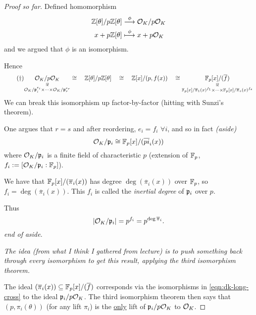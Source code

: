 \begin{proof}[Proof so far]
    Defined homomorphism
    \begin{align*}
        \mathbb Z[\theta]/p\mathbb Z[\theta] & \overset{\phi}{\longrightarrow} \mathcal{O}_K/p\mathcal{O}_K \\
        x + p\mathbb Z[\theta]         & \overset{\phi}{\longmapsto} x + p\mathcal{O}_K
    \end{align*}
    and we argued that $\phi$ is an isomorphism.

    Hence
    \begin{equation}\label{eqn:dk-long-cross}\tag{\textdagger}
        \underset{
        \substack{\text{\rotatebox[origin=c]{270}{$\cong$}} \\ \riO_K/\frk{p}_i^{e_i}\times \cdots \times \riO_K/\frk{p}_r^{e_r}}
        }{\riO_K / p\riO_K}
        \cong \quad \ZZ[\theta]/p\ZZ[\theta]\quad \cong\quad  \ZZ[x]/(p, f(x))\quad\cong \underset{
            \substack{\text{\rotatebox[origin=c]{270}{$\cong$}} \\ \FF_p[x]/\overline{\pi}_1(x)^{f_1}\times \cdots \times \FF_p[x]/\overline{\pi}_s(x)^{f_s}}
        }{\FF_p[x]/(\overline{f})}
    \end{equation}
    We can break this isomorphism up factor-by-factor (hitting with Sunzi's theorem).

    One argues that $r = s$ and after reordering, $e_i = f_i$ $\forall i$, and so in fact \emph{(aside)}
    \[\mathcal{O}_K/\mathfrak{p}_i\cong \mathbb F_p[x]/(\overline{pi}_i(x))\]
    where $\mathcal{O}_K/\mathfrak{p}_i$ is a finite field of characteristic $p$ (extension of $\mathbb F_p$, $f_i:=[\mathcal{O}_K/\mathfrak{p}_i : \mathbb F_p]$).

    We have that $\mathbb F_p[x]/(\overline{\pi}_i(x))$ has degree $\deg(\overline{\pi}_i(x))$ over $\mathbb F_p$, so $f_i = \deg(\overline{\pi}_i(x))$. This $f_i$ is called the \emph{inertial degree} of $\mathfrak{p}_i$ over $p$.

    Thus
    \[|\mathcal{O}_K / \mathfrak{p}_i| = p^{f_i} = p^{\deg \overline{\pi}_i}.\]
    \emph{end of aside}.

    \emph{The idea (from what I think I gathered from lecture) is to push something back through every isomorphism to get this result, applying the third isomorphism theorem. }

    The ideal $(\overline{\pi}_i(x))\subseteq \mathbb F_p[x]/(\overline{f})$ corresponds via the isomorphisms in \cref{eqn:dk-long-cross} to the ideal $\mathfrak{p}_i/p\mathcal{O}_K$. The third isomorphism theorem then says that $(p, \pi_i(\theta))$ (for any lift $\pi_i$) is the \ul{only} lift of $\mathfrak{p}_i/p\mathcal{O}_K$ to $\mathcal{O}_K$.
\end{proof}

